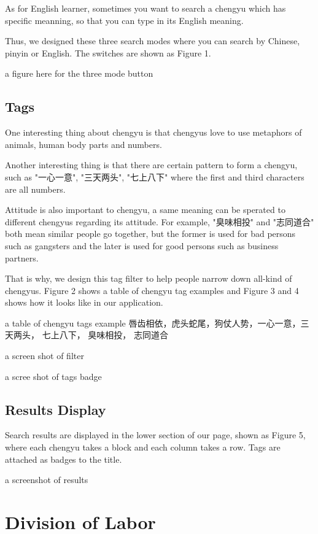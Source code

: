 \documentclass[11pt]{article} %
\begin{document}
As for English learner, sometimes you want to search a chengyu which has specific meanning, so that you can type in its English meaning.

Thus, we designed these three search modes where you can search by Chinese, pinyin or English. The switches are shown as Figure 1.

\indent a figure here for the three mode button

\subsection{Tags}
\indent One interesting thing about chengyu is that chengyus love to use metaphors of animals, human body parts and numbers.

Another interesting thing is that there are certain pattern to form a chengyu, such as "一心一意", "三天两头", "七上八下" where the first and third characters are all numbers.

Attitude is also important to chengyu, a same meaning can be sperated to different chengyus regarding its attitude. For example, "臭味相投" and "志同道合" both mean similar people go together, but the former is used for bad persons such as gangsters and the later is used for good persons such as business partners.

That is why, we design this tag filter to help people narrow down all-kind of chengyus. Figure 2 shows a table of chengyu tag examples and Figure 3 and 4 shows how it looks like in our application. 

\indent a table of chengyu tags example 唇齿相依，虎头蛇尾，狗仗人势，一心一意，三天两头， 七上八下， 臭味相投， 志同道合

\indent a screen shot of filter

\indent a scree shot of tags badge

\subsection{Results Display}

\indent Search results are displayed in the lower section of our page, shown as Figure 5, where each chengyu takes a block and each column takes a row. Tags are attached as badges to the title.

\indent a screenshot of results

\section{Division of Labor}
\end{document}
